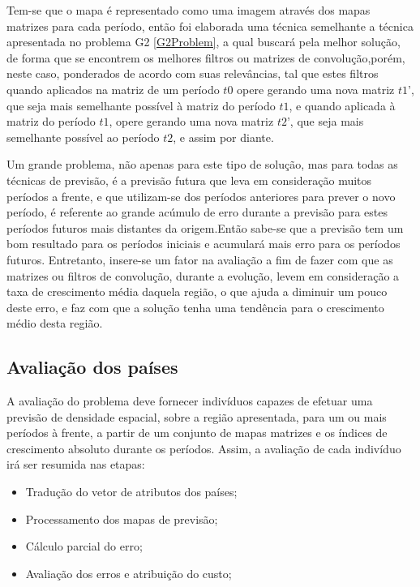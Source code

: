 Tem-se que o mapa é representado como uma imagem através dos mapas matrizes para cada período, então foi elaborada uma técnica  semelhante a técnica apresentada no problema G2 \ref{G2Problem}, a qual buscará pela melhor solução, de forma que se encontrem os melhores filtros ou matrizes de convolução,porém, neste caso,  ponderados de acordo com suas relevâncias, tal que estes filtros quando aplicados na matriz de um período \(t0\) opere gerando uma nova matriz \(t1’\), que seja mais semelhante possível à matriz do período \(t1\), e quando aplicada à matriz do período \(t1\), opere gerando uma nova matriz \(t2’\), que seja mais semelhante possível ao período \(t2\), e assim por diante.

Um grande problema, não apenas para este tipo de solução, mas para todas as técnicas de previsão, é a previsão futura que leva em consideração muitos períodos a frente, e que utilizam-se dos períodos anteriores para prever o novo período, é  referente ao grande acúmulo de erro durante a previsão para estes períodos futuros mais distantes da origem.Então sabe-se que a previsão tem um bom resultado para os períodos iniciais e acumulará mais erro para os períodos futuros. Entretanto, insere-se um fator na avaliação a fim de fazer com que as matrizes ou filtros de convolução, durante a evolução, levem em consideração a taxa de crescimento média daquela região, o que ajuda a diminuir um pouco deste erro, e faz com que a solução tenha uma tendência para o crescimento médio desta região.


\subsection{Avaliação dos países}
\label{Avaliação dos países}

A avaliação do problema deve fornecer indivíduos capazes de efetuar uma previsão de densidade espacial, sobre a região apresentada, para um ou mais períodos à frente, a partir de um conjunto de mapas matrizes e os índices de crescimento absoluto durante os períodos. Assim, a avaliação de cada indivíduo irá ser resumida nas etapas:
\begin{itemize}
\item Tradução do vetor de atributos dos países;
\item Processamento dos mapas de previsão; 
\item Cálculo parcial do erro;
\item Avaliação dos erros e atribuição do custo;
\end{itemize}


